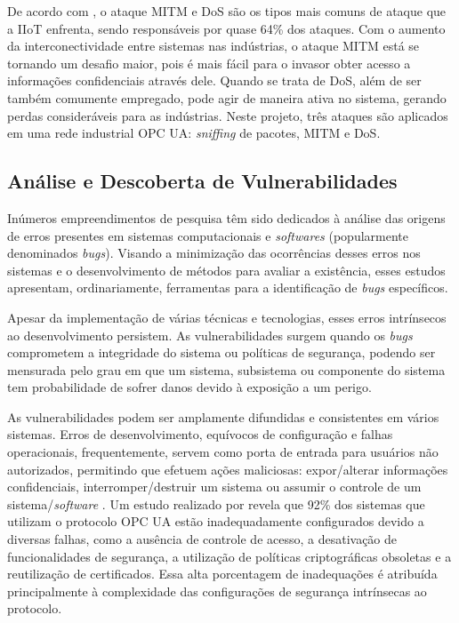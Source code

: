     De acordo com \cite{cekerevac2017}, o ataque MITM e DoS são os tipos mais comuns de ataque que a IIoT enfrenta, sendo responsáveis por quase 64\% dos ataques. Com o aumento da interconectividade entre sistemas nas indústrias, o ataque MITM está se tornando um desafio maior, pois é mais fácil para o invasor obter acesso a informações confidenciais através dele. Quando se trata de DoS, além de ser também comumente empregado, pode agir de maneira ativa no sistema, gerando perdas consideráveis para as indústrias. Neste projeto, três ataques são aplicados em uma rede industrial OPC UA: \textit{sniffing} de pacotes, MITM e DoS.
    

    \subsection{Análise e Descoberta de Vulnerabilidades} \label{subsec:analVul}

    Inúmeros empreendimentos de pesquisa têm sido dedicados à análise das origens de erros presentes em sistemas computacionais e \textit{softwares} (popularmente denominados \textit{bugs}). Visando a minimização das ocorrências desses erros nos sistemas e o desenvolvimento de métodos para avaliar a existência, esses estudos apresentam, ordinariamente, ferramentas para a identificação de \textit{bugs} específicos.

    Apesar da implementação de várias técnicas e tecnologias, esses erros intrínsecos ao desenvolvimento persistem. As vulnerabilidades surgem quando os \textit{bugs} comprometem a integridade do sistema ou políticas de segurança, podendo ser mensurada pelo grau em que um sistema, subsistema ou componente do sistema tem probabilidade de sofrer danos devido à exposição a um perigo.

    As vulnerabilidades podem ser amplamente difundidas e consistentes em vários sistemas. Erros de desenvolvimento, equívocos de configuração e falhas operacionais, frequentemente, servem como porta de entrada para usuários não autorizados, permitindo que efetuem ações maliciosas: expor/alterar informações confidenciais, interromper/destruir um sistema ou assumir o controle de um sistema/\textit{software} \cite{dowd2006}. Um estudo realizado por  revela que 92\% dos sistemas que utilizam o protocolo OPC UA estão inadequadamente configurados devido a diversas falhas, como a ausência de controle de acesso, a desativação de funcionalidades de segurança, a utilização de políticas criptográficas obsoletas e a reutilização de certificados. Essa alta porcentagem de inadequações é atribuída principalmente à complexidade das configurações de segurança intrínsecas ao protocolo.
    
